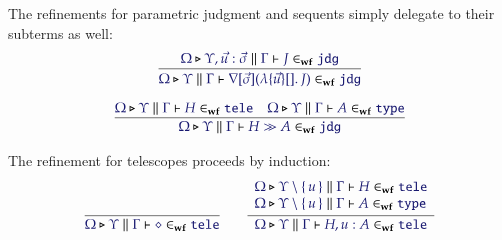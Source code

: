 \documentclass[11pt]{article}
\theoremstyle{definition}
\theoremstyle{remark}
\numberwithin{equation}{section}
\def\IModeColorName{MidnightBlue}
\newcommand\IMode[1]{{\color{\IModeColorName}{#1}}}
\newcommand\MkSet[1]{\left\{\,#1\,\right\}}
\newcommand\MkBTm[3]{\mathbb{\lambda}\{#1\}[#2].\, #3}
\newcommand\IsWf[5]{%
  \IMode{#1}\triangleright%
  \IMode{#2}\parallel%
  \IMode{#3}\vdash%
  \IMode{#4}\in_{\mathbf{wf}}\IMode{#5}%
}
\newcommand\App[2]{#1(#2)}
\begin{document}
The refinements for parametric judgment and sequents simply delegate to their
subterms as well:
\begin{gather*}
  \infer{
    \IsWf{\Omega}{\Upsilon}{\Gamma}{
      \App{\OpNabla{\vec{\sigma}}}{
        \MkBTm{\vec{u}}{}{J}
      }
    }{\SortJdg}
  }{
    \IsWf{\Omega}{\Upsilon,\vec{u}:\vec{\sigma}}{\Gamma}{J}{\SortJdg}
  }\\[6pt]
  \infer{
    \IsWf{\Omega}{\Upsilon}{\Gamma}{
      H\gg A
    }{\SortJdg}
  }{
    \IsWf{\Omega}{\Upsilon}{\Gamma}{H}{\SortTele} &
    \IsWf{\Omega}{\Upsilon}{\Gamma}{A}{\SortType}
  }
\end{gather*}

The refinement for telescopes proceeds by induction:
\begin{gather*}
  \infer{
    \IsWf{\Omega}{\Upsilon}{\Gamma}{\diamond}{\SortTele}
  }{
  }
  \qquad
  \infer{
    \IsWf{\Omega}{\Upsilon}{\Gamma}{H,u:A}{\SortTele}
  }{
    \begin{array}{l}
      \IsWf{\Omega}{\Upsilon\setminus\MkSet{u}}{\Gamma}{H}{\SortTele}\\
      \IsWf{\Omega}{\Upsilon\setminus\MkSet{u}}{\Gamma}{A}{\SortType}
    \end{array}
  }
\end{gather*}

\ifdraft{}{
  \nocite{*}
  
  
}
\end{document}
